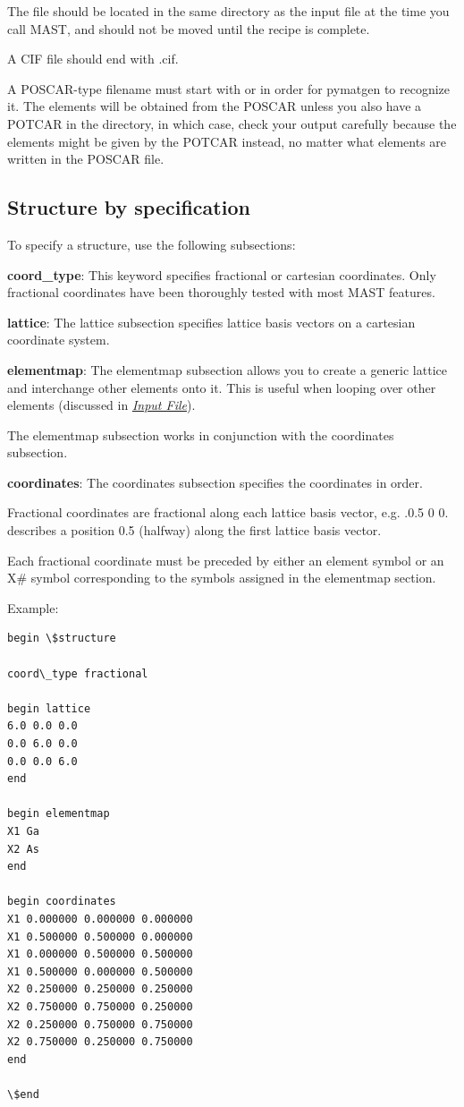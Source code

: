 \documentclass[letterpaper,10pt,english]{sphinxmanual}
\begin{document}
The file should be located in the same directory as the input file at the time you call MAST, and should not be moved until the recipe is complete.

A CIF file should end with .cif.

A POSCAR-type filename must start with  or  in order for pymatgen to recognize it. The elements will be obtained from the POSCAR unless you also have a POTCAR in the directory, in which case, check your output carefully because the elements might be given by the POTCAR instead, no matter what elements are written in the POSCAR file.


\subsection{Structure by specification}
\label{3_1_1_structure:structure-by-specification}
To specify a structure, use the following subsections:

\textbf{coord\_type}: This keyword specifies fractional or cartesian coordinates. Only fractional coordinates have been thoroughly tested with most MAST features.

\textbf{lattice}: The lattice subsection specifies lattice basis vectors on a cartesian coordinate system.

\textbf{elementmap}: The elementmap subsection allows you to create a generic lattice and interchange other elements onto it. This is useful when looping over other elements (discussed in {\hyperref[3_0_inputfile::doc]{\emph{Input File}}}).

The elementmap subsection works in conjunction with the coordinates subsection.

\textbf{coordinates}: The coordinates subsection specifies the coordinates in order.

Fractional coordinates are fractional along each lattice basis vector, e.g. .0.5 0 0. describes a position 0.5 (halfway) along the first lattice basis vector.

Each fractional coordinate must be preceded by either an element symbol or an X\# symbol corresponding to the symbols assigned in the elementmap section.

Example:

\begin{Verbatim}[commandchars=\\\{\}]
begin \$structure

coord\_type fractional

begin lattice
6.0 0.0 0.0
0.0 6.0 0.0
0.0 0.0 6.0
end

begin elementmap
X1 Ga
X2 As
end

begin coordinates
X1 0.000000 0.000000 0.000000
X1 0.500000 0.500000 0.000000
X1 0.000000 0.500000 0.500000
X1 0.500000 0.000000 0.500000
X2 0.250000 0.250000 0.250000
X2 0.750000 0.750000 0.250000
X2 0.250000 0.750000 0.750000
X2 0.750000 0.250000 0.750000
end

\$end
\end{Verbatim}
\end{document}
